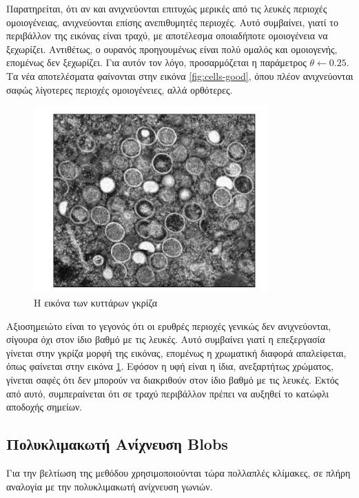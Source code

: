 \documentclass{article}
\newcommand{\eng}[1]{\foreignlanguage{english}{#1}}
\begin{document}
Παρατηρείται, ότι αν και ανιχνεύονται επιτυχώς μερικές από τις λευκές περιοχές ομοιογένειας, ανιχνεύονται επίσης ανεπιθυμητές περιοχές. Αυτό συμβαίνει, γιατί το περιβάλλον της εικόνας είναι τραχύ, με αποτέλεσμα οποιαδήποτε ομοιογένεια να ξεχωρίζει. Αντιθέτως, ο ουρανός προηγουμένως είναι πολύ ομαλός και ομοιογενής, επομένως δεν ξεχωρίζει. Για αυτόν τον λόγο, προσαρμόζεται η παράμετρος $\theta \leftarrow 0.25$. Τα νέα αποτελέσματα φαίνονται στην εικόνα \ref{fig:cells-good}, όπου πλέον ανιχνεύονται σαφώς λίγοτερες περιοχές ομοιογένειες, αλλά ορθότερες.

\begin{figure}[h]
    \centering
    \includegraphics[width=0.8\textwidth]{../image-plots/cells-gray-scaled.jpg}
    \caption{Η εικόνα των κυττάρων γκρίζα}
    \label{fig:cells-gray}
\end{figure}
\FloatBarrier

Αξιοσημειώτο είναι το γεγονός ότι οι ερυθρές περιοχές γενικώς δεν ανιχνεύονται, σίγουρα όχι στον ίδιο βαθμό με τις λευκές. Αυτό συμβαίνει γιατί η επεξεργασία γίνεται στην γκρίζα μορφή της εικόνας, επομένως η χρωματική διαφορά απαλείφεται, όπως φαίνεται στην εικόνα \ref{fig:cells-gray}. Εφόσον η υφή είναι η ίδια, ανεξαρτήτως χρώματος, γίνεται σαφές ότι δεν μπορούν να διακριθούν στον ίδιο βαθμό με τις λευκές. Εκτός από αυτό, συμπεραίνεται ότι σε τραχύ περιβάλλον πρέπει να αυξηθεί το κατώφλι αποδοχής σημείων.

\subsection{Πολυκλιμακωτή Ανίχνευση \eng{Blobs}}

Για την βελτίωση της μεθόδου χρησιμοποιούνται τώρα πολλαπλές κλίμακες, σε πλήρη αναλογία με την πολυκλιμακωτή ανίχνευση γωνιών.
\end{document}
